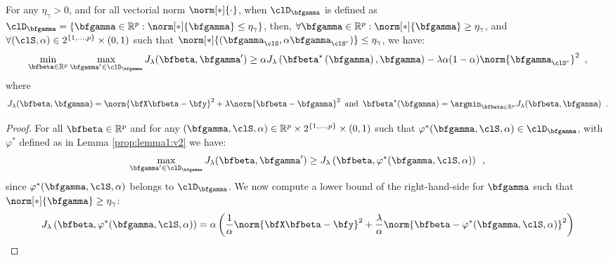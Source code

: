 \begin{proposition}\label{prop:monitoring:appendix:v2}
  For any $\eta_\gamma>0$, and for all vectorial norm $\norm[*]{\cdot}$,
  when 
  $\clD_{\bfgamma}$ is defined as 
  $\clD_{\bfgamma}=\left\{\bfgamma \in \mathbb{R}^{p}:
                      \norm[*]{\bfgamma} \leq\eta_\gamma
                    \right\}$, then, 
  $\forall \bfgamma \in \mathbb{R}^{p}:\norm[*]{\bfgamma} \geq\eta_\gamma$, and 
  $\forall (\clS,\alpha)\in2^{\{1,\ldots,p\}}\times(0,1)$ such that 
  $\norm[*]{(\bfgamma_{\clS},\alpha\bfgamma_{\clS^c })}\leq\eta_\gamma$, we   
  have:
  \begin{equation*}
    \min_{\bfbeta\in\mathbb{R}^{p}} \max_{\bfgamma' \in \clD_{\bfgamma}} 
    J_\lambda(\bfbeta,\bfgamma') 
    \geq
    \alpha J_\lambda\left(\bfbeta^\star\left(\bfgamma\right),\bfgamma\right) -
    \lambda \alpha (1-\alpha) \norm{\bfgamma_{\clS^c}}^{2}
    \enspace,
  \end{equation*}
  where 
  \begin{equation*}
    J_\lambda(\bfbeta,\bfgamma) = \norm{\bfX \bfbeta - \bfy}^2 + 
      \lambda \norm{\bfbeta - \bfgamma}^2
    \enspace \text{and} \enspace
    \bfbeta^\star(\bfgamma) = \argmin_{\bfbeta\in\mathbb{R}^{p}} J_\lambda(\bfbeta,\bfgamma)
    \enspace.
  \end{equation*}
  \begin{proof} 
  For all $\bfbeta \in \mathbb{R}^{p}$ and for any $(\bfgamma,\clS,\alpha) \in
  \mathbb{R}^{p}\times2^{\{1,\ldots,p\}}\times(0,1)$ such that
  $\varphi^{*}(\bfgamma,\clS,\alpha) \in \clD_{\bfgamma}$, with $\varphi^{*}$ 
  defined as in Lemma \ref{prop:lemma1:v2} we have:
  \begin{equation}\label{eq:maxgreater:v2}
    \max_{\bfgamma' \in \clD_{\bfgamma}} 
    J_\lambda(\bfbeta,\bfgamma') 
    \geq
    J_\lambda\left(\bfbeta,\varphi^{*}(\bfgamma,\clS,\alpha)\right)
    \enspace,
  \end{equation}
  since $\varphi^{*}(\bfgamma,\clS,\alpha)$ belongs to $\clD_{\bfgamma}$. 
  We now compute a lower bound of the right-hand-side for $\bfgamma$ such that
  $\norm[*]{\bfgamma} \geq \eta_\gamma$:
    \begin{align}       
      J_\lambda\left(\bfbeta,\varphi^{*}(\bfgamma,\clS,\alpha)\right) 
        & = \alpha \left( 
              \frac{1}{\alpha} \norm{\bfX \bfbeta - \bfy}^2 + 
              \frac{\lambda}{\alpha} 
              \norm{\bfbeta - \varphi^{*}(\bfgamma,\clS,\alpha)}^2
            \right)  
            \nonumber \\

\end{align}
\end{proof}
\end{proposition}
